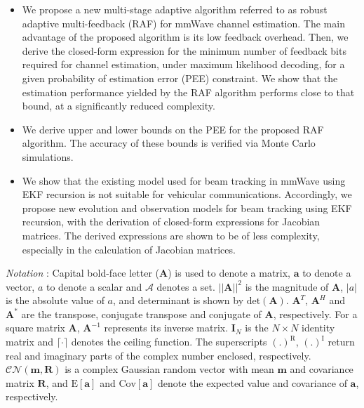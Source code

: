 \documentclass{ieeeaccess}
\begin{document}
\begin{itemize}
  \item We propose a new multi-stage adaptive algorithm referred to as robust adaptive multi-feedback (RAF) for mmWave channel estimation. The main advantage of the proposed algorithm is its low feedback overhead. Then, we derive the closed-form expression for the minimum number of feedback bits required for channel estimation, under maximum likelihood decoding, for a given probability of estimation error (PEE) constraint. We show that the estimation performance yielded by the RAF algorithm performs close to that bound, at a significantly reduced complexity.
  \item We derive upper and lower bounds on the PEE for the proposed RAF algorithm. The accuracy of these bounds is verified via Monte Carlo simulations.
  \item We show that the existing model used for beam tracking in mmWave using EKF recursion is not suitable for vehicular communications. Accordingly, we propose new evolution and observation models for beam tracking using EKF recursion, with the derivation of closed-form expressions for Jacobian matrices. The derived expressions are shown to be of less complexity, especially in the calculation of Jacobian matrices.\\
\end{itemize}

\textit{Notation} : Capital bold-face letter ($\boldsymbol{A}$) is used to denote a matrix, $\boldsymbol{a}$ to denote a vector, ${a}$ to denote a scalar and $\mathcal{A}$ denotes a set. $||\boldsymbol{A}||^2$ is the magnitude of $\boldsymbol{A}$, $|a|$ is the absolute value of $a$, and determinant is shown by $\text{det}(\boldsymbol{A})$. $\boldsymbol{A}^T$, $\boldsymbol{A}^H$ and $\boldsymbol{A}^*$ are the transpose, conjugate transpose and conjugate of $\boldsymbol{A}$, respectively. For a square matrix $\boldsymbol{A}$, $\boldsymbol{A}^{-1}$ represents its inverse matrix. $\boldsymbol{I}_N$ is the $N\times N$ identity matrix and $\lceil \cdot \rceil$ denotes the ceiling function. The superscripts $(.)^\textrm{R}$, $(.)^\textrm{I}$ return real and imaginary parts of the complex number enclosed, respectively. $\mathcal{C}\mathcal{N}(\boldsymbol{m},\boldsymbol{R})$ is a complex Gaussian random vector with mean $\boldsymbol{m}$ and covariance matrix $\boldsymbol{R}$, and $\text{E}[\boldsymbol{a}]$ and $\text{Cov}[\boldsymbol{a}]$ denote the expected value and covariance of ${\boldsymbol{a}}$, respectively.
\end{document}
